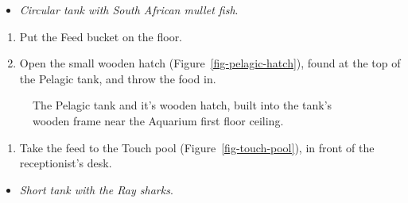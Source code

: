 \documentclass[
  letterpaper,
  DIV=11,
  numbers=noendperiod]{scrreprt}
\providecommand{\tightlist}{%
  \setlength{\itemsep}{0pt}\setlength{\parskip}{0pt}}\usepackage{longtable,booktabs,array}
\begin{document}
\begin{itemize}
\tightlist
\item
  \emph{Circular tank with South African mullet fish}.
\end{itemize}

\begin{enumerate}
\def\labelenumi{\arabic{enumi}.}
\setcounter{enumi}{13}
\tightlist
\item
  Put the Feed bucket on the floor.
\item
  Open the small wooden hatch (Figure~\ref{fig-pelagic-hatch}), found at
  the top of the Pelagic tank, and throw the food in.
\end{enumerate}

\begin{figure}[H]

\begin{minipage}[t]{0.50\linewidth}

{\centering 


}

\end{minipage}%
%
\begin{minipage}[t]{0.50\linewidth}

{\centering 


}

\end{minipage}%

\caption{\label{fig-pelagic}The Pelagic tank and it's wooden hatch,
built into the tank's wooden frame near the Aquarium first floor
ceiling.}

\end{figure}

\begin{enumerate}
\def\labelenumi{\arabic{enumi}.}
\setcounter{enumi}{15}
\tightlist
\item
  Take the feed to the Touch pool (Figure~\ref{fig-touch-pool}), in
  front of the receptionist's desk.
\end{enumerate}

\begin{itemize}
\tightlist
\item
  \emph{Short tank with the Ray sharks}.
\end{itemize}
\end{document}
